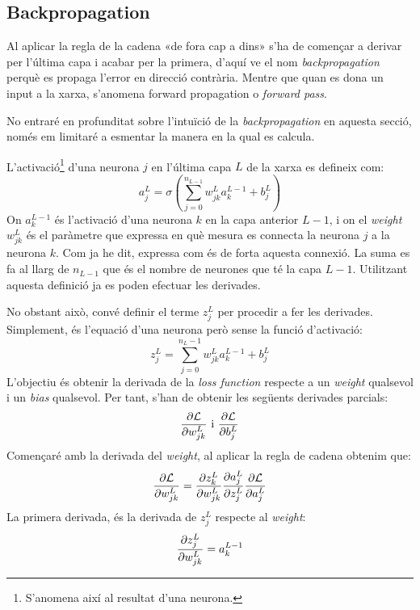 \subsection{Backpropagation}
Al aplicar la regla de la cadena «de fora cap a dins» s'ha de començar a derivar per l'última capa i acabar per la primera, d'aquí ve el nom \textit{backpropagation} perquè es propaga l'error en direcció contrària. Mentre que quan es dona un input a la xarxa, s'anomena {forward propagation} o \textit{forward pass}.

No entraré en profunditat sobre l'intuïció de la \textit{backpropagation} en aquesta secció, només em limitaré a esmentar la manera en la qual es calcula.

L'activació\footnote{S'anomena així al resultat d'una neurona.} d'una neurona $j$ en l'última capa $L$ de la xarxa es defineix com: 
$$
a^{L}_j = \sigma\left(\sum_{j=0}^{n_{L- 1}}w^L_{jk} a^{L-1}_k+ b_j^L\right)
$$
On $a^{L-1}_k$ és l'activació d'una neurona $k$ en la capa anterior $L-1$, i on el \textit{weight} $w^L_{jk}$ és el paràmetre que expressa en què mesura es connecta la neurona $j$ a la neurona $k$. Com ja he dit, expressa com és de forta aquesta connexió. La suma es fa al llarg de $n_{L-1}$ que és el nombre de neurones que té la capa $L-1$. Utilitzant aquesta definició ja es poden efectuar les derivades.

No obstant això, convé definir el terme $z_j^L$ per procedir a fer les derivades. Simplement, és l'equació d'una neurona però sense la funció d'activació:
\begin{equation}
\label{eq:neuron_definition}
	z_j^L = \sum_{j=0}^{n_L - 1}w^L_{jk} a^{L-1}_k+ b_j^L
\end{equation}
L'objectiu és obtenir la derivada de la \textit{loss function} respecte a un \textit{weight} qualsevol i un \textit{bias} qualsevol. Per tant, s'han de obtenir les següents derivades parcials:
$$
\pdv{\mathcal{L}}{w_{jk}^L} \text{ i } \pdv{\mathcal{L}}{b_j^L}
$$
Començaré amb la derivada del \textit{weight}, al aplicar la regla de cadena obtenim que:
\begin{equation}
	\pdv{\mathcal{L}}{w_{jk}^L} = \pdv{z_k^L}{w_{jk}^L}\pdv{a_j^L}{z_j^L}\pdv{\mathcal{L}}{a_j^L}
	\label{eq:chain_neuron}
\end{equation}
La primera derivada, és la derivada de $z_j^L$ respecte al \textit{weight}:
\begin{equation*}
	\pdv{z_j^L}{w_{jk}^L} = a^{L-1}_k
\end{equation*}

